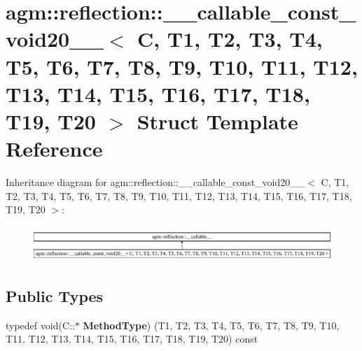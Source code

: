 \hypertarget{structagm_1_1reflection_1_1____callable__const__void20____}{}\section{agm\+:\+:reflection\+:\+:\+\_\+\+\_\+callable\+\_\+const\+\_\+void20\+\_\+\+\_\+$<$ C, T1, T2, T3, T4, T5, T6, T7, T8, T9, T10, T11, T12, T13, T14, T15, T16, T17, T18, T19, T20 $>$ Struct Template Reference}
\label{structagm_1_1reflection_1_1____callable__const__void20____}
Inheritance diagram for agm\+:\+:reflection\+:\+:\+\_\+\+\_\+callable\+\_\+const\+\_\+void20\+\_\+\+\_\+$<$ C, T1, T2, T3, T4, T5, T6, T7, T8, T9, T10, T11, T12, T13, T14, T15, T16, T17, T18, T19, T20 $>$\+:\begin{figure}[H]
\begin{center}
\leavevmode
\includegraphics[height=1.346154cm]{structagm_1_1reflection_1_1____callable__const__void20____}
\end{center}
\end{figure}
\subsection*{Public Types}
\begin{DoxyCompactItemize}
\item 
typedef void(C\+::$\ast$ {\bfseries Method\+Type}) (T1, T2, T3, T4, T5, T6, T7, T8, T9, T10, T11, T12, T13, T14, T15, T16, T17, T18, T19, T20) const \hypertarget{structagm_1_1reflection_1_1____callable__const__void20_____aafd86c7eb9772c9e88caf208393016d3}{}\label{structagm_1_1reflection_1_1____callable__const__void20_____aafd86c7eb9772c9e88caf208393016d3}

\end{DoxyCompactItemize}
